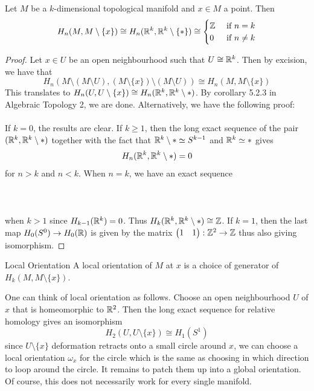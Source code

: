 \documentclass[a4paper]{article}
\begin{document}
\begin{prp}{}{} Let $M$ be a $k$-dimensional topological manifold and $x\in M$ a point. Then $$H_n(M,M\setminus\{x\})\cong H_n(\mathbb{R}^k,\mathbb{R}^k\setminus\{\ast\})\cong\begin{cases}
\mathbb{Z} & \text{ if } n=k\\
0 & \text{ if } n\neq k
\end{cases}$$ \tcbline
\begin{proof}
Let $x\in U$ be an open neighbourhood such that $U\cong\mathbb{R}^k$. Then by excision, we have that $$H_n(M\setminus(M\setminus U),(M\setminus\{x\})\setminus(M\setminus U))\cong H_n(M,M\setminus\{x\})$$ This translates to $H_n(U,U\setminus\{x\})\cong H_n(\mathbb{R}^k,\mathbb{R}^k\setminus\ast)$. By corollary 5.2.3 in Algebraic Topology 2, we are done. Alternatively, we have the following proof: \\~\\

If $k=0$, the results are clear. If $k\geq 1$, then the long exact sequence of the pair $(\mathbb{R}^k,\mathbb{R}^k\setminus\ast)$ together with the fact that $\mathbb{R}^k\setminus\ast\simeq S^{k-1}$ and $\mathbb{R}^k\simeq\ast$ gives $$H_n(\mathbb{R}^k,\mathbb{R}^k\setminus\ast)=0$$ for $n>k$ and $n<k$. When $n=k$, we have an exact sequence \\~\\
\\~\\
when $k>1$ since $H_{k-1}(\mathbb{R}^k)=0$. Thus $H_k(\mathbb{R}^k,\mathbb{R}^k\setminus\ast)\cong\mathbb{Z}$. If $k=1$, then the last map $H_0(S^0)\to H_0(\mathbb{R})$ is given by the matrix $\begin{pmatrix}
1 & 1
\end{pmatrix}:\mathbb{Z}^2\to\mathbb{Z}$ thus also giving isomorphism. 
\end{proof}
\end{prp}

\begin{defn}{Local Orientation}{} A local orientation of $M$ at $x$ is a choice of generator of $H_k(M,M\setminus\{x\})$. 
\end{defn}

One can think of local orientation as follows. Choose an open neighbourhood $U$ of $x$ that is homeomorphic to $\mathbb{R}^2$. Then the long exact sequence for relative homology gives an isomorphism $$H_2(U,U\setminus\{x\})\cong H_1(S^1)$$ since $U\setminus\{x\}$ deformation retracts onto a small circle around $x$, we can choose a local orientation $\omega_x$ for the circle which is the same as choosing in which direction to loop around the circle. It remains to patch them up into a global orientation. Of course, this does not necessarily work for every single manifold. \\~\\
\end{document}
